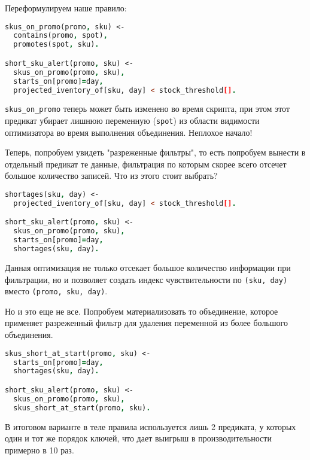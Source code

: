 Переформулируем наше правило:

\begin{lstlisting}[language=Prolog]
skus_on_promo(promo, sku) <-
  contains(promo, spot),
  promotes(spot, sku).

short_sku_alert(promo, sku) <-
  skus_on_promo(promo, sku),
  starts_on[promo]=day,
  projected_iventory_of[sku, day] < stock_threshold[].
\end{lstlisting}

\lstinline{skus_on_promo} теперь может быть изменено во время скрипта, при этом этот предикат убирает лишнюю переменную (\lstinline{spot}) из области видимости оптимизатора во время выполнения объединения. Неплохое начало!

Теперь, попробуем увидеть "разреженные фильтры", то есть попробуем вынести в отдельный предикат те данные, фильтрация по которым скорее всего отсечет большое количество записей. Что из этого стоит выбрать?

\begin{lstlisting}[language=Prolog]
shortages(sku, day) <-
  projected_iventory_of[sku, day] < stock_threshold[].

short_sku_alert(promo, sku) <-
  skus_on_promo(promo, sku),
  starts_on[promo]=day,
  shortages(sku, day).
\end{lstlisting}

Данная оптимизация не только отсекает большое количество информации при фильтрации, но и позволяет создать индекс чувствительности по \lstinline{(sku, day)} вместо \lstinline{(promo, sku, day)}.

Но и это еще не все. Попробуем материализовать то объединение, которое применяет разреженный фильтр для удаления переменной из более большого объединения.

\begin{lstlisting}[language=Prolog]
skus_short_at_start(promo, sku) <-
  starts_on[promo]=day,
  shortages(sku, day).

short_sku_alert(promo, sku) <-
  skus_on_promo(promo, sku),
  skus_short_at_start(promo, sku).
\end{lstlisting}

В итоговом варианте в теле правила используется лишь 2 предиката, у которых один и тот же порядок ключей, что дает выигрыш в производительности примерно в 10 раз.
